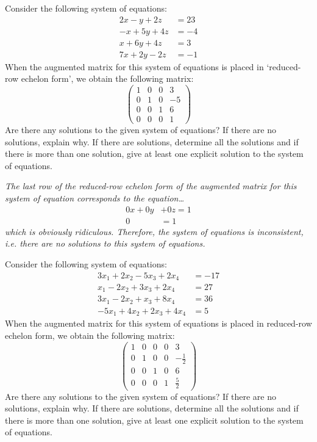 \documentclass[12pt,letterpaper]{exam}
\begin{document}
\begin{questions}
\newpage
\question[10] Consider the following system of equations:
	\[
	\begin{aligned}
	2x - y + 2z&= 23 \\
	-x + 5y + 4z&= -4 \\
	x + 6y + 4z&= 3 \\
	7x + 2y - 2z&= -1
	\end{aligned}
	\]
When the augmented matrix for this system of equations is placed in `reduced-row echelon form', we obtain the following matrix:
	\[
	\begin{pmatrix}
	1 & 0 & 0 & 3 \\
	0 & 1 & 0 & -5 \\
	0 & 0 & 1 & 6 \\
	0 & 0 & 0 & 1
	\end{pmatrix}	
	\]
Are there any solutions to the given system of equations? If there are no solutions, explain why. If there are solutions, determine all the solutions and if there is more than one solution, give at least one explicit solution to the system of equations. \pvspace{1cm}

{\itshape The last row of the reduced-row echelon form of the augmented matrix for this system of equation corresponds to the equation\dots
	\[
	\begin{aligned}
	0x + 0y &+ 0z= 1 \\
	0&= 1
	\end{aligned}
	\]
which is obviously ridiculous. Therefore, the system of equations is inconsistent, i.e. there are no solutions to this system of equations.}



\newpage
\question[10] Consider the following system of equations:
	\[
	\begin{aligned}
	3x_1 + 2x_2 - 5x_3 + 2x_4&= -17 \\
	x_1 - 2x_2 + 3x_3 + 2x_4&= 27 \\
	3x_1 - 2x_2 + x_3 + 8x_4&= 36 \\
	-5x_1 + 4x_2 + 2x_3 + 4x_4&= 5
	\end{aligned}
	\]
When the augmented matrix for this system of equations is placed in reduced-row echelon form, we obtain the following matrix:
	\[
	\begin{pmatrix}
	1 & 0 & 0 & 0 & 3 \\
	0 & 1 & 0 & 0 & -\frac{1}{2} \\
	0 & 0 & 1 & 0 & 6 \\
	0 & 0 & 0 & 1 & \frac{5}{2}
	\end{pmatrix}	
	\]
Are there any solutions to the given system of equations? If there are no solutions, explain why. If there are solutions, determine all the solutions and if there is more than one solution, give at least one explicit solution to the system of equations. \pvspace{1cm}


\end{questions}
\end{document}

